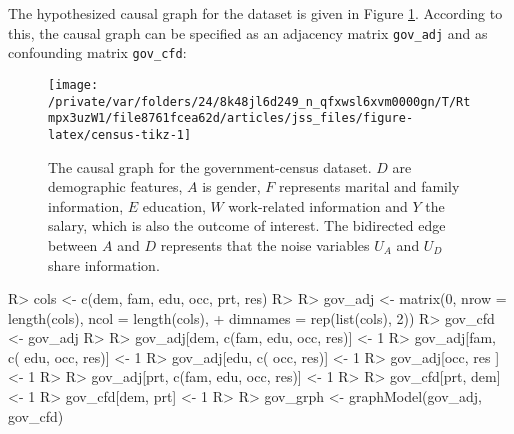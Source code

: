 \documentclass[
  nojss]{jss}
\begin{document}
The hypothesized causal graph for the dataset is given in Figure
\ref{fig:census-tikz}. According to this, the causal graph can be
specified as an adjacency matrix \texttt{gov\_adj} and as confounding
matrix \texttt{gov\_cfd}:

\begin{CodeChunk}
\begin{figure}

{\centering \texttt{[image: /private/var/folders/24/8k48jl6d249\_n\_qfxwsl6xvm0000gn/T/Rtmpx3uzW1/file8761fcea62d/articles/jss\_files/figure-latex/census-tikz-1]} 

}

\caption[The causal graph for the government-census dataset]{The causal graph for the government-census dataset. $D$ are demographic features, $A$ is gender, $F$ represents marital and family information, $E$ education, $W$ work-related information and $Y$ the salary, which is also the outcome of interest. The bidirected edge between $A$ and $D$ represents that the noise variables $U_A$ and $U_D$ share information.}\label{fig:census-tikz}
\end{figure}
\end{CodeChunk}

\begin{CodeChunk}
\begin{CodeInput}
R> cols <- c(dem, fam, edu, occ, prt, res)
R> 
R> gov_adj <- matrix(0, nrow = length(cols), ncol = length(cols),
+                   dimnames = rep(list(cols), 2))
R> gov_cfd <- gov_adj
R> 
R> gov_adj[dem, c(fam, edu, occ, res)] <- 1
R> gov_adj[fam, c(     edu, occ, res)] <- 1
R> gov_adj[edu, c(          occ, res)] <- 1
R> gov_adj[occ,                  res ] <- 1
R> 
R> gov_adj[prt, c(fam, edu, occ, res)] <- 1
R> 
R> gov_cfd[prt, dem] <- 1
R> gov_cfd[dem, prt] <- 1
R> 
R> gov_grph <- graphModel(gov_adj, gov_cfd)
\end{CodeInput}
\end{CodeChunk}
\end{document}
